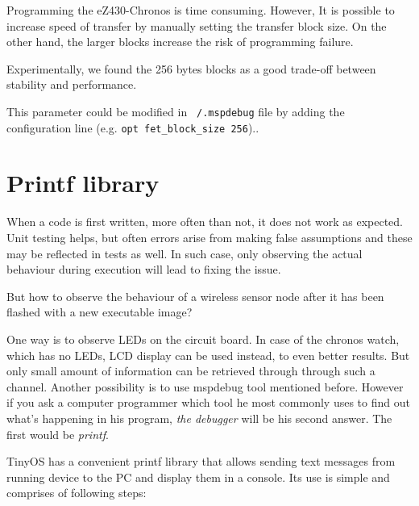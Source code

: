 Programming the eZ430-Chronos is time consuming.
However, It is possible to increase speed of transfer by manually setting the transfer block size.
On the other hand, the larger blocks increase the risk of programming failure.

Experimentally, we found the 256 bytes blocks as a good trade-off between stability and performance.

This parameter could be modified in \texttt{~/.mspdebug} file by adding the configuration line (e.g. \texttt{opt fet\_block\_size 256})..


\section{Printf library}
\label{sec:printf_library}

When a code is first written, more often than not, it does not work as
expected. Unit testing helps, but often errors arise from making false
assumptions and these may be reflected in tests as well. In such case,
only observing the actual behaviour during execution will lead to
fixing the issue.

But how to observe the behaviour of a wireless sensor node after it
has been flashed with a new executable image?

One way is to observe LEDs on the circuit board.  In case of the
chronos watch, which has no LEDs, LCD display can be used instead, to
even better results. But only small amount of information can be
retrieved through through such a channel. Another possibility is to
use mspdebug tool mentioned before.  However if you ask a computer
programmer which tool he most commonly uses to find out what's
happening in his program, \emph{the debugger} will be his second
answer. The first would be \emph{printf}.

TinyOS has a convenient printf library that allows sending text
messages from running device to the PC and display them in a console.
Its use is simple and comprises of following steps:

